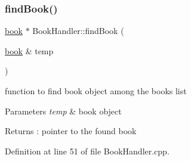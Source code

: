\subsubsection{\texorpdfstring{find\+Book()}{findBook()}}
{\footnotesize\ttfamily \hyperlink{classbook}{book} $\ast$ Book\+Handler\+::find\+Book (\begin{DoxyParamCaption}\item[{\hyperlink{classbook}{book} \&}]{temp }\end{DoxyParamCaption})}

function to find book object among the books list 
\begin{DoxyParams}{Parameters}
{\em temp} & book object \\
\hline
\end{DoxyParams}
\begin{DoxyReturn}{Returns}
\+: pointer to the found book 
\end{DoxyReturn}


Definition at line 51 of file Book\+Handler.\+cpp.


